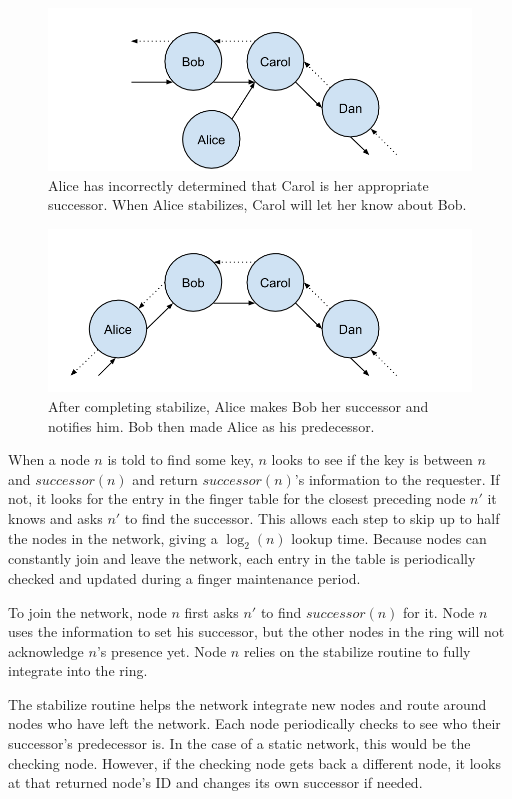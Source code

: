 \begin{figure}
	\centering
	\includegraphics[width=0.7\linewidth]{figs/abcd1}
	\caption[An error in Chord]{Alice has incorrectly determined that Carol is her appropriate successor.  When Alice stabilizes, Carol will let her know about Bob.}
	\label{fig:abcd1}
\end{figure}


\begin{figure}
	\centering
	\includegraphics[width=0.7\linewidth]{figs/abcd2}
	\caption[Stabilize fixing the error]{After completing stabilize, Alice makes Bob her successor and notifies him. Bob then made Alice as his predecessor.}
	\label{fig:abcd2}
\end{figure}



When a node $n$ is told to find some key, $n$ looks to see if the key is between $n$ and $successor(n)$ and return $successor(n)$'s information to the requester. 
If not, it looks for the entry in the finger table for the closest preceding node $n'$ it knows and asks $n'$ to find the successor.
This allows each step to skip up to half the nodes in the network, giving a $\log_2(n)$ lookup time.
Because nodes can constantly join and leave the network, each entry in the table is periodically checked and updated during a finger maintenance period. 

To join the network, node $n$ first asks $n'$ to find $successor(n)$ for it.  
Node $n$ uses the information to set his successor, but the other nodes in the ring will not acknowledge $n$'s presence yet.  
Node $n$ relies on the stabilize routine to fully integrate into the ring.

The stabilize routine helps the network integrate new nodes and route around nodes who have left the network. 
Each node periodically checks to see who their successor's predecessor is.  In the case of a static network, this would be the checking node.  
However, if the checking node gets back a different node, it looks at that returned node's ID and changes its own successor if needed.  

